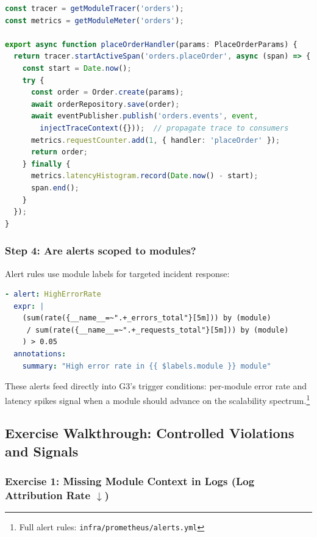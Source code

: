 \begin{lstlisting}[basicstyle=\ttfamily\scriptsize,language=TypeScript,caption={Traced handler with metrics integration},label={lst:g6-traced-handler}]
const tracer = getModuleTracer('orders');
const metrics = getModuleMeter('orders');

export async function placeOrderHandler(params: PlaceOrderParams) {
  return tracer.startActiveSpan('orders.placeOrder', async (span) => {
    const start = Date.now();
    try {
      const order = Order.create(params);
      await orderRepository.save(order);
      await eventPublisher.publish('orders.events', event,
        injectTraceContext({}));  // propagate trace to consumers
      metrics.requestCounter.add(1, { handler: 'placeOrder' });
      return order;
    } finally {
      metrics.latencyHistogram.record(Date.now() - start);
      span.end();
    }
  });
}
\end{lstlisting}

\subsubsection*{Step 4: Are alerts scoped to modules?}

Alert rules use module labels for targeted incident response:

\begin{lstlisting}[basicstyle=\ttfamily\scriptsize,language=yaml,caption={Module-scoped Prometheus alert rule},label={lst:g6-alert}]
- alert: HighErrorRate
  expr: |
    (sum(rate({__name__=~".+_errors_total"}[5m])) by (module)
     / sum(rate({__name__=~".+_requests_total"}[5m])) by (module)
    ) > 0.05
  annotations:
    summary: "High error rate in {{ $labels.module }} module"
\end{lstlisting}

\noindent
These alerts feed directly into G3's trigger conditions: per-module error rate and latency spikes signal when a module should advance on the scalability spectrum.\footnote{Full alert rules: \texttt{infra/prometheus/alerts.yml}}

\subsection*{Exercise Walkthrough: Controlled Violations and Signals}

\subsubsection*{Exercise 1: Missing Module Context in Logs (Log Attribution Rate $\downarrow$)}

